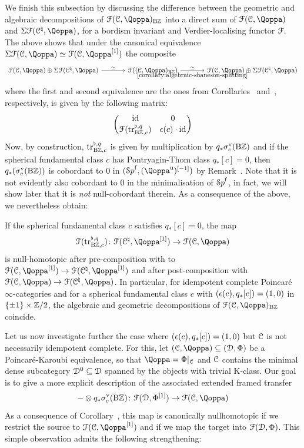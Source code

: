 We finish this subsection by discussing the difference between the geometric and algebraic decompositions of $\F(\C,\QF)_{\B\ZZ}$ into a direct sum of $\F(\C,\QF)$ and $\Sig\F(\C^{\natural},\QF)$, for a bordism invariant and Verdier-localising functor $\mathcal{F}$. The above shows that under the canonical equivalence $\Sigma \F(\C,\QF) \simeq \F(\C,\QF\qshift{1})$ the composite
\[
\begin{tikzcd}[column sep=large]
	\F(\C,\QF) \oplus \Sigma \F(\C^\natural,\QF) \ar[r,"\simeq"] & \F((\C,\QF)_{\B\ZZ}) \ar[r,"\simeq","{\reffour{corollary:algebraic-shaneson-splitting}}"'] & \F(\C,\QF) \oplus \Sigma \F(\C^\natural,\QF) 
\end{tikzcd}
\]
where the first and second equivalence are the ones from Corollaries~ and~, respectively,
is given by the following matrix:
\[
\begin{pmatrix}
	\mathrm{id} & 0 \\ \mathcal{F}(\mathrm{tr}^{\flat,q}_{\mathrm{B}\mathbb{Z},c}) & \epsilon(c)\cdot \mathrm{id}
\end{pmatrix}
\]
Now, by construction, $\mathrm{tr}^{\flat,q}_{\mathrm{B}\mathbb{Z},c}$ is given by multiplication by $q_*\sigma^{\mathrm{v}}_c(\mathrm{B}\mathbb{Z})$ and if the spherical fundamental class $c$ has Pontryagin-Thom class $q_*[c] = 0$, then $q_*(\sigma^{\mathrm{v}}_c(\mathrm{B}\mathbb{Z}))$ is cobordant to $0$ in $(\Spaf,(\QF^\uni)\qshift{-1})$ by Remark~. Note that it is not evidently also cobordant to $0$ in the minimalisation of ${\mathcal Sp}^{\mathrm{f}}$, in fact, we will show later that it is \emph{not} null-cobordant therein. As a consequence of the above, we nevertheless obtain:

\begin{corollary} 
\label{cor:geometric=algebraic-decomposition}%
If the spherical fundamental class $c$ satisfies $q_*[c]=0$, the map 
\[
\F(\tr^{\flat,q}_{\B\ZZ,c})\colon \F(\C^\natural,\QF\qshift{1}) \to \F(\C,\QF)
\]
is null-homotopic after pre-composition with to $\F(\C, \QF\qshift{1})\to \F(\C^\natural,\QF\qshift{1})$ and after post-composition with $\F(\C,\QF) \to \F(\C^\natural,\QF)$. In particular, for idempotent complete Poincar\'e $\infty$-categories and for a spherical fundamental class $c$ with $(\epsilon(c),q_*[c]) = (1,0)$ in $\{\pm1\} \times \mathbb{Z}/2$, the algebraic and geometric decompositions of $\F(\C,\QF)_{\B\ZZ}$ coincide.
\end{corollary} 



Let us now investigate further the case where $(\epsilon(c),q_*[c]) = (1,0)$ but $\mathcal C$ is not necessarily idempotent complete. For this, let $(\C,\QF)\subseteq (\D,\QFD)$ be a Poincar\'e-Karoubi equivalence, so that $\QF = \QFD|_{\C}$ and $\mathcal C$ contains the minimal dense subcategory $\mathcal{D}^0\subseteq \mathcal{D}$ spanned by the objects with trivial K-class. Our goal is to give a more explicit description of the associated extended framed transfer
\[
-\otimes q_*\vsign_c(\B\ZZ)\colon \F(\D, \QFD\qshift 1) \to \F(\C, \QF)
\]
As a consequence of Corollary~, this map is canonically nullhomotopic if we restrict the source to $\F(\C, \QF\qshift 1)$ and if we map the target into $\mathcal{F}(\mathcal{D}, \Phi)$. This simple observation admits the following strengthening:



